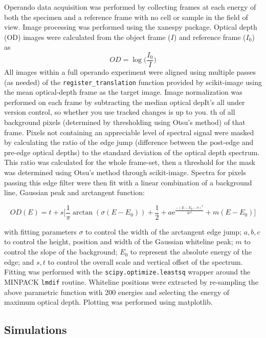 \documentclass{article}
\begin{document}
Operando data acquisition was performed by collecting frames at each
energy of both the specimen and a reference frame with no cell or
sample in the field of view. Image processing was performed using the
xanespy package\cite{xanespy}. Optical depth (OD) images were
calculated from the object frame ($I$) and reference frame ($I_0$) as
$$OD = \log{\big(\frac{I_0}{I}\big)}$$ All images within a full
operando experiment were aligned using multiple passes (as needed) of
the \texttt{register\_translation} function provided by
scikit-image\cite{walt2014} using the mean optical-depth frame as the
target image. Image normalization was performed on each frame by
subtracting the median optical depIt's all under version control, so whether you use tracked changes is
up to you.
th of all background pixels
(determined by thresholding using Otsu's method\cite{otsu1979}) of
that frame\cite{jin2015}. Pixels not containing an appreciable level
of  spectral signal were masked by calculating the ratio of the
edge jump (difference between the post-edge and pre-edge optical
depths) to the standard deviation of the optical depth spectrum. This
ratio was calculated for the whole frame-set, then a threshold for the
mask was determined using Otsu's method\cite{otsu1979} through
scikit-image\cite{walt2014}. Spectra for pixels passing this edge
filter were then fit with a linear combination of a background line,
Gaussian peak and arctangent function:

\begin{equation}
  OD(E) = t + s\bigg[\frac{1}{\pi}\arctan(\sigma (E-E_0)) + \frac{1}{2} +
    a\mathrm{e}^{\frac{-(E-E_0-b)^2}{2c^2}} + m(E-E_0)\bigg]
  \label{eq:kedge-fitting}
\end{equation}

with fitting parameters $\sigma$ to control the width of the
arctangent edge jump; $a, b, c$ to control the height, position and
width of the Gaussian whiteline peak; $m$ to control the slope of the
background; $E_0$ to represent the absolute energy of the edge; and
$s, t$ to control the overall scale and vertical offset of the
spectrum. Fitting was performed with the
\texttt{scipy.optimize.leastsq} wrapper around the MINPACK
\texttt{lmdif} routine\cite{scipy}. Whiteline positions were extracted
by re-sampling the above parametric function with 200 energies and
selecting the energy of maximum optical depth. Plotting was performed
using matplotlib\cite{matplotlib}.

\subsection*{Simulations}
\end{document}
